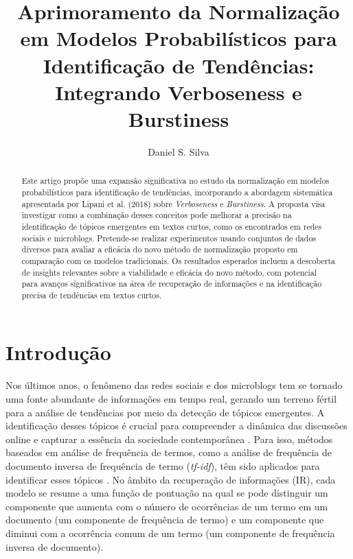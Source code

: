 \documentclass[runningheads]{llncs}
\begin{document}
%
\title{Aprimoramento da Normalização em Modelos Probabilísticos para Identificação de Tendências: Integrando Verboseness e Burstiness}
%
%
\author{Daniel S. Silva}
%
%
%
\maketitle              %
%
\begin{abstract}
Este artigo propõe uma expansão significativa no estudo da normalização em modelos probabilísticos para identificação de tendências, incorporando a abordagem sistemática apresentada por Lipani et al. (2018) sobre \textit{Verboseness} e \textit{Burstiness}. A proposta visa investigar como a combinação desses conceitos pode melhorar a precisão na identificação de tópicos emergentes em textos curtos, como os encontrados em redes sociais e microblogs. Pretende-se realizar experimentos usando conjuntos de dados diversos para avaliar a eficácia do novo método de normalização proposto em comparação com os modelos tradicionais. Os resultados esperados incluem a descoberta de insights relevantes sobre a viabilidade e eficácia do novo método, com potencial para avanços significativos na área de recuperação de informações e na identificação precisa de tendências em textos curtos.

\end{abstract}
%
%
%

\section{Introdução}

Nos últimos anos, o fenômeno das redes sociais e dos microblogs tem se tornado uma fonte abundante de informações em tempo real, gerando um terreno fértil para a análise de tendências por meio da detecção de tópicos emergentes. A identificação desses tópicos é crucial para compreender a dinâmica das discussões online e capturar a essência da sociedade contemporânea \cite{Aiello2013}. Para isso, métodos baseados em análise de frequência de termos, como a análise de frequência de documento inversa de frequência de termo (\textit{tf-idf}), têm sido aplicados para identificar esses tópicos \cite{Benhardus2013}. No âmbito da recuperação de informações (IR), cada modelo se resume a uma função de pontuação na qual se pode distinguir um componente que aumenta com o número de ocorrências de um termo em um documento (um componente de frequência de termo) e um componente que diminui com a ocorrência comum de um termo (um componente de frequência inversa de documento).
\end{document}
